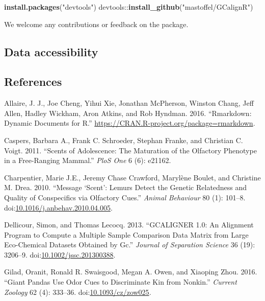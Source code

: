 \documentclass[]{article}
\newenvironment{Shaded}{}{}
\newcommand{\KeywordTok}[1]{\textbf{{#1}}}
\newcommand{\StringTok}[1]{\textcolor[rgb]{0.87,0.00,0.00}{{#1}}}
\newcommand{\NormalTok}[1]{{#1}}
\begin{document}
\begin{Shaded}
\begin{Highlighting}[]
\KeywordTok{install.packages}\NormalTok{(}\StringTok{"devtools"}\NormalTok{)}
\NormalTok{devtools::}\KeywordTok{install_github}\NormalTok{(}\StringTok{"mastoffel/GCalignR"}\NormalTok{)}
\end{Highlighting}
\end{Shaded}

We welcome any contributions or feedback on the package.

\subsection{Data accessibility}\label{data-accessibility}

\subsection*{References}\label{references}

\hypertarget{refs}{}
\hypertarget{ref-Allaire.2016}{}
Allaire, J. J., Joe Cheng, Yihui Xie, Jonathan McPherson, Winston Chang,
Jeff Allen, Hadley Wickham, Aron Atkins, and Rob Hyndman. 2016.
``Rmarkdown: Dynamic Documents for R.''
\url{https://CRAN.R-project.org/package=rmarkdown}.

\hypertarget{ref-Caspers.2011}{}
Caspers, Barbara A., Frank C. Schroeder, Stephan Franke, and Christian
C. Voigt. 2011. ``Scents of Adolescence: The Maturation of the Olfactory
Phenotype in a Free-Ranging Mammal.'' \emph{PloS One} 6 (6): e21162.

\hypertarget{ref-Charpentier.2010}{}
Charpentier, Marie J.E., Jeremy Chase Crawford, Marylène Boulet, and
Christine M. Drea. 2010. ``Message `Scent': Lemurs Detect the Genetic
Relatedness and Quality of Conspecifics via Olfactory Cues.''
\emph{Animal Behaviour} 80 (1): 101--8.
doi:\href{https://doi.org/10.1016/j.anbehav.2010.04.005}{10.1016/j.anbehav.2010.04.005}.

\hypertarget{ref-Dellicour.2013}{}
Dellicour, Simon, and Thomas Lecocq. 2013. ``GCALIGNER 1.0: An Alignment
Program to Compute a Multiple Sample Comparison Data Matrix from Large
Eco-Chemical Datasets Obtained by Gc.'' \emph{Journal of Separation
Science} 36 (19): 3206--9.
doi:\href{https://doi.org/10.1002/jssc.201300388}{10.1002/jssc.201300388}.

\hypertarget{ref-Gilad.2016}{}
Gilad, Oranit, Ronald R. Swaisgood, Megan A. Owen, and Xiaoping Zhou.
2016. ``Giant Pandas Use Odor Cues to Discriminate Kin from Nonkin.''
\emph{Current Zoology} 62 (4): 333--36.
doi:\href{https://doi.org/10.1093/cz/zow025}{10.1093/cz/zow025}.
\end{document}

